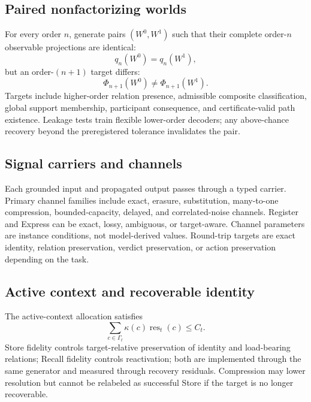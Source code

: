 \documentclass[11pt]{article}
\begin{document}
\subsection{Paired nonfactorizing worlds}

For every order $n$, generate pairs $(W^0,W^1)$ such that their complete order-$n$ observable projections are identical:
\begin{equation}
q_n(W^0)=q_n(W^1),
\end{equation}
but an order-$(n+1)$ target differs:
\begin{equation}
\Phi_{n+1}(W^0)\ne\Phi_{n+1}(W^1).
\end{equation}
Targets include higher-order relation presence, admissible composite classification, global support membership, participant consequence, and certificate-valid path existence. Leakage tests train flexible lower-order decoders; any above-chance recovery beyond the preregistered tolerance invalidates the pair.

\subsection{Signal carriers and channels}

Each grounded input and propagated output passes through a typed carrier. Primary channel families include exact, erasure, substitution, many-to-one compression, bounded-capacity, delayed, and correlated-noise channels. Register and Express can be exact, lossy, ambiguous, or target-aware. Channel parameters are instance conditions, not model-derived values. Round-trip targets are exact identity, relation preservation, verdict preservation, or action preservation depending on the task.

\subsection{Active context and recoverable identity}

The active-context allocation satisfies
\begin{equation}
\sum_{c\in\Gamma_t}\kappa(c)\operatorname{res}_t(c)\le C_t.
\end{equation}
Store fidelity controls target-relative preservation of identity and load-bearing relations; Recall fidelity controls reactivation; both are implemented through the same generator and measured through recovery residuals. Compression may lower resolution but cannot be relabeled as successful Store if the target is no longer recoverable.
\end{document}
